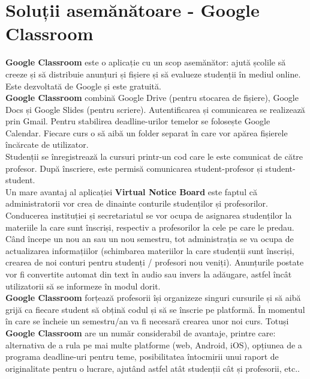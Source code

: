 \documentclass[12pt]{article}
\newcommand\tab[1][1cm]{\hspace*{#1}}
\begin{document}
\section{Soluții asemănătoare - Google Classroom}
\tab \textbf{Google Classroom} este o aplicație cu un scop asemănător: ajută școlile să creeze și să distribuie anunțuri și fișiere și să evalueze studenții în mediul online. Este dezvoltată de Google și este gratuită.\\
\tab \textbf{Google Classroom} combină Google Drive (pentru stocarea de fișiere), Google Docs și Google Slides (pentru scriere). Autentificarea și comunicarea se realizează prin Gmail. Pentru stabilirea deadline-urilor temelor se folosește Google Calendar. Fiecare curs o să aibă un folder separat în care vor apărea fișierele încărcate de utilizator. \\
\tab Studenții se înregistrează la cursuri printr-un cod care le este comunicat de către profesor. După înscriere, este permisă comunicarea student-profesor și student-student. \\
\tab Un mare avantaj al aplicației \textbf{Virtual Notice Board} este faptul că administratorii vor crea de dinainte conturile studenților și profesorilor. Conducerea instituției și secretariatul se vor ocupa de asignarea studenților la materiile la care sunt înscriși, respectiv a profesorilor la cele pe care le predau. Când începe un nou an sau un nou semestru, tot administrația se va ocupa de actualizarea informațiilor (schimbarea materiilor la care studenții sunt înscriși, crearea de noi conturi pentru studenți / profesori nou veniți). Anunțurile postate vor fi convertite automat din text în audio sau invers la adăugare, astfel încât utilizatorii să se informeze în modul dorit. \\
\tab \textbf{Google Classroom} forțează profesorii își organizeze singuri cursurile și să aibă grijă ca fiecare student să obțină codul și să se înscrie pe platformă. În momentul în care se încheie un semestru/an va fi necesară crearea unor noi curs. Totuși \textbf{Google Classroom} are un număr considerabil de avantaje, printre care: alternativa de a rula pe mai multe platforme (web, Android, iOS), opțiunea de a programa deadline-uri pentru teme, posibilitatea întocmirii unui raport de originalitate pentru o lucrare, ajutând astfel atât studenții cât și profesorii, etc..
\end{document}
